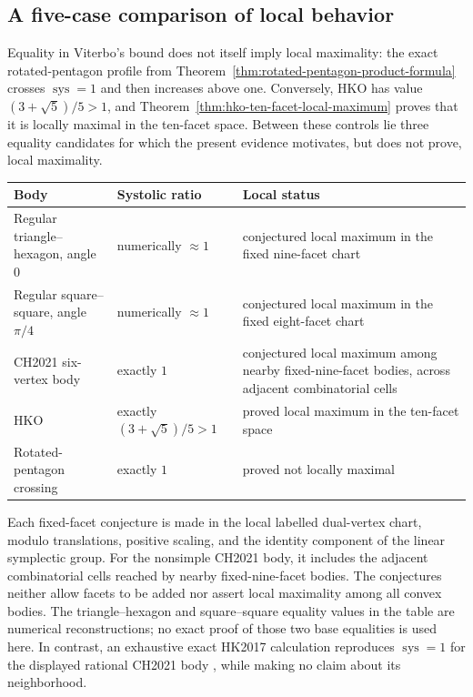 \subsection{A five-case comparison of local behavior}
\label{subsec:five-case-local-maxima-comparison}

Equality in Viterbo's bound does not itself imply local maximality: the exact
rotated-pentagon profile from
Theorem~\ref{thm:rotated-pentagon-product-formula} crosses
\(\operatorname{sys}=1\) and then increases above one.  Conversely, HKO has
value \((3+\sqrt5)/5>1\), and
Theorem~\ref{thm:hko-ten-facet-local-maximum} proves that it is locally maximal
in the ten-facet space.  Between these controls lie three equality candidates
for which the present evidence motivates, but does not prove, local
maximality.

\begin{center}
\small
\begin{tabular}{@{}p{.25\linewidth}p{.19\linewidth}p{.46\linewidth}@{}}
\toprule
Body & Systolic ratio & Local status \\
\midrule
Regular triangle--hexagon, angle \(0\) & numerically \(\approx1\) & conjectured local maximum in the fixed nine-facet chart \\
Regular square--square, angle \(\pi/4\) & numerically \(\approx1\) & conjectured local maximum in the fixed eight-facet chart \\
CH2021 six-vertex body \cite{CH2021} & exactly \(1\) & conjectured local maximum among nearby fixed-nine-facet bodies, across adjacent combinatorial cells \\
HKO & exactly \((3+\sqrt5)/5>1\) & proved local maximum in the ten-facet space \\
Rotated-pentagon crossing & exactly \(1\) & proved not locally maximal \\
\bottomrule
\end{tabular}
\end{center}

Each fixed-facet conjecture is made in the local labelled dual-vertex chart,
modulo translations, positive scaling, and the identity component of the
linear symplectic group.  For the nonsimple CH2021 body, it includes the
adjacent combinatorial cells reached by nearby fixed-nine-facet bodies.  The
conjectures neither allow facets to be added nor assert local maximality among
all convex bodies.  The triangle--hexagon and square--square equality values
in the table are numerical reconstructions; no exact proof of those two base
equalities is used here.  In contrast, an exhaustive exact HK2017 calculation
reproduces \(\operatorname{sys}=1\) for the displayed rational CH2021 body
\cite{CH2021},
while making no claim about its neighborhood.

